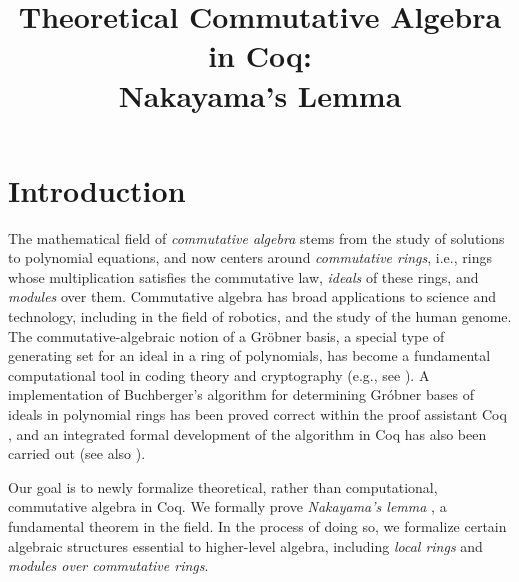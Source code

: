 \documentclass{article}
\begin{document}



\title{%
Theoretical Commutative Algebra in Coq: \\ Nakayama's Lemma}

\date{}


\maketitle


\begin{abstract}
\end{abstract}




\section{Introduction}

The mathematical field of \emph{commutative algebra} stems from the study of solutions to polynomial equations, and now centers around \emph{commutative rings}, i.e., rings whose multiplication satisfies the commutative law, \emph{ideals} of these rings, and \emph{modules} over them. 
Commutative algebra has broad applications to science and technology, including in the field of robotics, and the study of the human genome.
The commutative-algebraic notion of a Gr\"obner basis, a special type of generating set for an ideal in a ring of polynomials, has become a fundamental computational tool in 
coding theory and cryptography (e.g., see  \cite{grobner-bases-cryptography}).
A implementation of Buchberger's algorithm \cite{buchberger} for determining 
Gr\'obner bases of ideals in polynomial rings has been proved correct within the proof assistant Coq \cite{the_coq_development_team_2019_3476303,thery-buchberger}, and an integrated formal development of the algorithm in Coq has also been carried out \cite{persson2001integrated} (see also \cite{grobner-type-theory}). 

Our goal is to newly formalize theoretical, rather than computational, commutative algebra in Coq.  We formally prove \emph{Nakayama's lemma} \cite{nakayama-1951, azumaya}, a fundamental theorem in the field. 
In the process of doing so,  we formalize certain algebraic structures  essential to higher-level algebra, including \emph{local rings} and \emph{modules over commutative rings}. 
\end{document}
